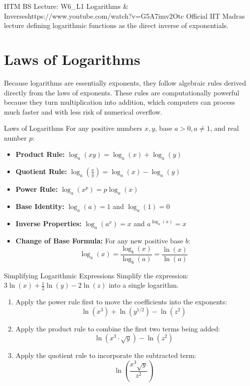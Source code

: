 \begin{videocard}{IITM BS Lecture: W6\_L1 Logarithms \& Inverses}{https://www.youtube.com/watch?v=G5A7imv2Otc}
Official IIT Madras lecture defining logarithmic functions as the direct inverse of exponentials.
\end{videocard}

\section{Laws of Logarithms}

Because logarithms are essentially exponents, they follow algebraic rules derived directly from the laws of exponents. These rules are computationally powerful because they turn multiplication into addition, which computers can process much faster and with less risk of numerical overflow.

\begin{theorembox}{Laws of Logarithms}
For any positive numbers $x, y$, base $a > 0, a \neq 1$, and real number $p$:
\begin{itemize}
    \item \textbf{Product Rule:} $\log_a(xy) = \log_a(x) + \log_a(y)$
    \item \textbf{Quotient Rule:} $\log_a\left(\frac{x}{y}\right) = \log_a(x) - \log_a(y)$
    \item \textbf{Power Rule:} $\log_a(x^p) = p \log_a(x)$
    \item \textbf{Base Identity:} $\log_a(a) = 1$ and $\log_a(1) = 0$
    \item \textbf{Inverse Properties:} $\log_a(a^x) = x$ and $a^{\log_a(x)} = x$
    \item \textbf{Change of Base Formula:} For any new positive base $b$:
    $$\log_a(x) = \frac{\log_b(x)}{\log_b(a)} = \frac{\ln(x)}{\ln(a)}$$
\end{itemize}
\end{theorembox}

\begin{examplebox}{Simplifying Logarithmic Expressions}
Simplify the expression: $3\ln(x) + \frac{1}{2}\ln(y) - 2\ln(z)$ into a single logarithm.
\begin{enumerate}
    \item Apply the power rule first to move the coefficients into the exponents:
    $$\ln(x^3) + \ln(y^{1/2}) - \ln(z^2)$$
    \item Apply the product rule to combine the first two terms being added:
    $$\ln(x^3 \cdot \sqrt{y}) - \ln(z^2)$$
    \item Apply the quotient rule to incorporate the subtracted term:
    $$\ln\left(\frac{x^3\sqrt{y}}{z^2}\right)$$
\end{enumerate}
\end{examplebox}

